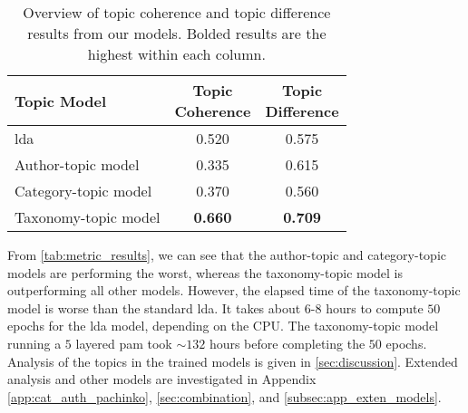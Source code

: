 \begin{table}[b]
	\centering
	\caption{Overview of topic coherence and topic difference results from our models. Bolded results are the highest within each column.}
	\begin{tabular}{l|c|c}
		Topic Model & \makecell{Topic \\ Coherence} & \makecell{Topic \\ Difference} \\
		\midrule
		\Acrlong{lda} & 0.520 & 0.575 \\
		Author-topic model & 0.335 & 0.615 \\
		Category-topic model & 0.370 & 0.560 \\
		Taxonomy-topic model & \textbf{0.660} & \textbf{0.709} \\
	\end{tabular}
	\label{tab:metric_results}
\end{table}

From \autoref{tab:metric_results}, we can see that the author-topic and category-topic models are performing the worst, whereas the taxonomy-topic model is outperforming all other models.
However, the elapsed time of the taxonomy-topic model is worse than the standard \gls{lda}.
It takes about $6$-$8$ hours to compute $50$ epochs for the \gls{lda} model, depending on the CPU. 
The taxonomy-topic model running a $5$ layered \gls{pam} took ${\sim}132$ hours before completing the $50$ epochs.
Analysis of the topics in the trained models is given in \autoref{sec:discussion}.
Extended analysis and other models are investigated in Appendix \autoref{app:cat_auth_pachinko}, \autoref{sec:combination}, and \autoref{subsec:app_exten_models}.

